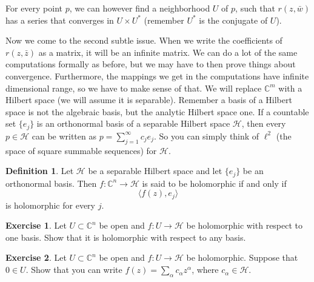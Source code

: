 \documentclass[12pt,openany]{book}
\newcommand{\C}{{\mathbb{C}}}
\newcommand{\sH}{{\mathcal{H}}}
\theoremstyle{plain}
\theoremstyle{remark}
\theoremstyle{definition}
\newtheorem{defn}[thm]{Definition}
\theoremstyle{exercise}
\newtheorem{exercise}{Exercise}[section]
\theoremstyle{example}
\begin{document}
For every point $p$, we can however find a neighborhood $U$ of $p$, such
that $r(z,\bar{w})$ has a series that converges in $U \times U^*$ (remember
$U^*$ is the conjugate of $U$).

Now we come to the second subtle issue.  When we write the coefficients of
$r(z,\bar{z})$ as a matrix, it will be an infinite matrix.  We can do a lot
of the same computations formally as before, but we may have to then prove
things about convergence.  Furthermore, the mappings we get in the
computations have infinite dimensional range, so we have to make sense of
that.  We will replace $\C^m$ with a Hilbert space (we will assume it is
separable).  Remember a basis of a Hilbert space is not the algebraic basis,
but the analytic Hilbert space one.  If a countable set $\{ e_j \}$ is an orthonormal
basis of a separable Hilbert space $\sH$, then every $p \in \sH$ can be written as
$p = \sum_{j=1}^\infty c_j e_j$.  So you can simply think of $\ell^2$ (the
space of square summable sequences) for
$\sH$.

\begin{defn}
Let $\sH$ be a separable Hilbert space and let $\{ e_j \}$ be an orthonormal
basis.  Then $f \colon \C^n \to \sH$ is said to be holomorphic if and only if
\begin{equation}
\langle f(z) , e_j \rangle
\end{equation}
is holomorphic for every $j$.
\end{defn}

\begin{exercise}
Let $U \subset \C^n$ be open and
$f \colon U \to \sH$ be holomorphic
with respect to one
basis.  Show that it is holomorphic with respect to any basis.
\end{exercise}

\begin{exercise}
Let $U \subset \C^n$ be open and
$f \colon U \to \sH$ be holomorphic.  Suppose that $0 \in U$.
Show that you can write
$f(z) = \sum_\alpha c_\alpha z^\alpha$, where $c_\alpha \in \sH$.
\end{exercise}
\end{document}
